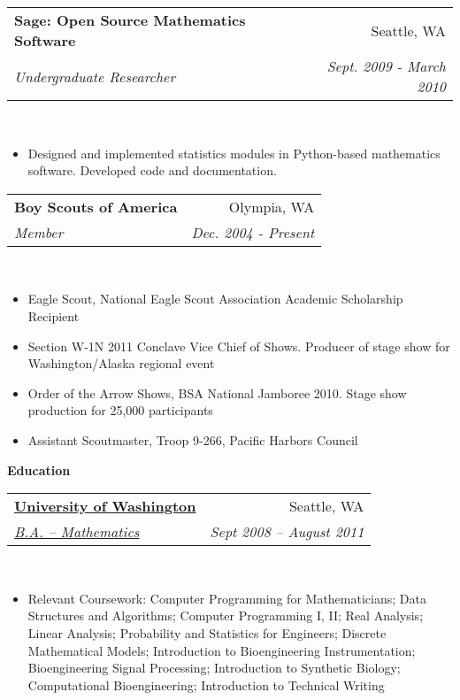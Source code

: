 \documentclass[letterpaper,11pt]{article}
\makeatletter
\newcommand{\resitem}[1]{\item #1 \vspace{-2pt}}
\newcommand{\resheading}[1]{{\large \colorbox{mygrey}{\begin{minipage}{\textwidth}{\textbf{#1 \vphantom{p\^{E}}}}\end{minipage}}}}
\newcommand{\ressubheading}[4]{ %
        \begin{tabular*}{\textwidth}{l@{\extracolsep{\fill}}r}
            \textbf{#1} & #2 \\
                  \textit{#3} & \textit{#4} \\
    \end{tabular*}\vspace{-6pt}}
\newenvironment{section-content}
    {\begin{Sbox}\begin{minipage}{\textwidth}\vspace{0.04in}}
        {\end{minipage}\end{Sbox}\colorbox{white}{\TheSbox}\vspace{0.1in}}
\makeatother
\begin{document}
\begin{section-content}
                \ressubheading{Sage: Open Source Mathematics Software}{Seattle, WA}{Undergraduate Researcher}{Sept. 2009 - March 2010}\\
                    {\footnotesize
                        \begin{itemize}
                                \resitem{Designed and implemented statistics modules in Python-based mathematics software. Developed code and documentation.}
                        \end{itemize}
                    }

                \ressubheading{Boy Scouts of America}{Olympia, WA}{Member}{Dec. 2004 - Present}\\
                    {\footnotesize
                        \begin{itemize}
                                \resitem{Eagle Scout, National Eagle Scout Association Academic Scholarship Recipient}
                                \resitem{Section W-1N 2011 Conclave Vice Chief of Shows. Producer of stage show for Washington/Alaska regional event}
                                \resitem{Order of the Arrow Shows, BSA National Jamboree 2010. Stage show production for 25,000 participants}
                                \resitem{Assistant Scoutmaster, Troop 9-266, Pacific Harbors Council}
                        \end{itemize}
                    }
            \end{section-content}  %

            \resheading{Education}
            \begin{section-content}
                \ressubheading{\href{http://www.washington.edu}{University of Washington}}{Seattle, WA}{\href{http://depts.washington.edu/lingweb/}{B.A. -- Mathematics}}{Sept 2008 -- August 2011}\\
                    { \footnotesize
                        \begin{itemize}
                                \resitem{Relevant Coursework: Computer Programming for Mathematicians; Data Structures and Algorithms; Computer Programming I, II; Real Analysis; Linear Analysis; Probability and Statistics for Engineers; Discrete Mathematical Models; Introduction to Bioengineering Instrumentation; Bioengineering Signal Processing; Introduction to Synthetic Biology; Computational Bioengineering; Introduction to Technical Writing}
                        \end{itemize}
                    }
            \end{section-content}
\end{document}
